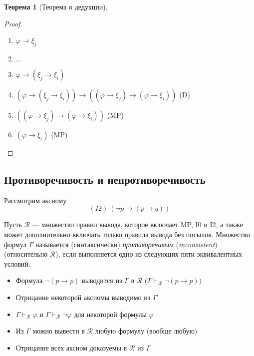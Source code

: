 \documentclass[12pt]{article}
\let\im\rightarrow
\let\n\neg
\theoremstyle{definition}
\newtheorem{theorem}{Теорема}[section]
\theoremstyle{statement}
\theoremstyle{theorem}
\begin{document}
\begin{theorem}[Теорема о дедукции]
\begin{proof}
\begin{itemize}
\begin{enumerate}
          \item $\varphi \im \xi_j$

          \item $\dots$

          \item $\varphi \im (\xi_j \im \xi_i)$

          \item $(\varphi \im (\xi_j \im \xi_i)) \im ((\varphi \im
            \xi_j) \im (\varphi \im \xi_i))$ (D)

          \item $((\varphi \im \xi_j) \im (\varphi \im \xi_i))$ (MP)

          \item $(\varphi \im \xi_i)$ (MP)
        \end{enumerate}
    \end{itemize}
  \end{proof}
\end{theorem}

\subsection{Противоречивость и непротиворечивость}

Рассмотрим аксиому
\begin{displaymath}
  (I2)\ (\n p \im (p \im q))
\end{displaymath}

Пусть $\mathcal{R}$ --- множество правил вывода, которое включает MP,
I0 и I2, а также может дополнительно включать только правила вывода
без посылок. Множество формул $\Gamma$ называется (синтаксически)
\textit{противоречивым} (\textit{inconsistent}) (относительно
$\mathcal{R}$), если
выполняется одно из следующих пяти эквивалентных условий:
\begin{itemize}
  \item Формула $\n(p \im p)$ выводится из $\Gamma$ в $\mathcal{R}$
    ($\Gamma \vdash_{\mathcal{R}} \n (p \im p))$

  \item Отрицание некоторой аксиомы выводимо из $\Gamma$

  \item $\Gamma \vdash_{\mathcal{R}} \varphi$ и $\Gamma
    \vdash_{\mathcal{R}} \n \varphi$ для некоторой формулы $\varphi$

  \item Из $\Gamma$ можно вывести в $\mathcal{R}$ любую формулу (вообще любую)

  \item Отрицание всех аксиом доказуемы в $\mathcal{R}$ из $\Gamma$
\end{itemize}
\end{document}
